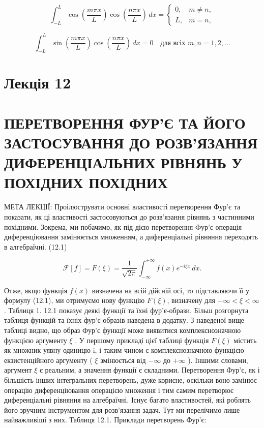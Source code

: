 \documentclass[
  ukrainian,
]{article}
\begin{document}
\[
\int_{-L}^{L} \cos\!\left(\frac{m\pi x}{L}\right)\cos\!\left(\frac{n\pi x}{L}\right)\,dx =
\begin{cases}
0, & m \neq n,\\
L, & m = n,
\end{cases}
\]

\[
\int_{-L}^{L} \sin\!\left(\frac{m\pi x}{L}\right)\cos\!\left(\frac{n\pi x}{L}\right)\,dx = 0
\quad \text{для всіх } m,n=1,2,\dots
\]

\section{Лекція 12}\label{ux43bux435ux43aux446ux456ux44f-12}

\section{ПЕРЕТВОРЕННЯ ФУР'Є ТА ЙОГО ЗАСТОСУВАННЯ ДО РОЗВ'ЯЗАННЯ
ДИФЕРЕНЦІАЛЬНИХ РІВНЯНЬ У ПОХІДНИХ
ПОХІДНИХ}\label{ux43fux435ux440ux435ux442ux432ux43eux440ux435ux43dux43dux44f-ux444ux443ux440ux454-ux442ux430-ux439ux43eux433ux43e-ux437ux430ux441ux442ux43eux441ux443ux432ux430ux43dux43dux44f-ux434ux43e-ux440ux43eux437ux432ux44fux437ux430ux43dux43dux44f-ux434ux438ux444ux435ux440ux435ux43dux446ux456ux430ux43bux44cux43dux438ux445-ux440ux456ux432ux43dux44fux43dux44c-ux443-ux43fux43eux445ux456ux434ux43dux438ux445-ux43fux43eux445ux456ux434ux43dux438ux445}

МЕТА ЛЕКЦІЇ: Проілюструвати основні властивості перетворення Фур'є та
показати, як ці властивості застосовуються до розв'язання рівнянь з
частинними похідними. Зокрема, ми побачимо, як під дією перетворення
Фур'є операція диференціювання замінюється множенням, а диференціальні
рівняння переходять в алгебраїчні. (12.1)

\[
\mathcal{F}[f] = F(\xi) = \frac{1}{\sqrt{2\pi}} \int_{-\infty}^{+\infty} f(x)e^{-i\xi x}\,dx.
\]

Отже, якщо функція \(f(x)\) визначена на всій дійсній осі, то
підставляючи її у формулу (12.1), ми отримуємо нову функцію \(F(\xi)\),
визначену для \(-\infty < \xi < \infty\). Таблиця 1. 12.1 показує деякі
функції та їхні фур'є-образи. Більш розгорнута таблиця функцій та їхніх
фур'є-образів наведена в додатку. З наведеної вище таблиці видно, що
образ Фур'є функції може виявитися комплекснозначною функцією аргументу
\(\xi\) . У першому прикладі цієї таблиці функція \(F(\xi)\) містить як
множник уявну одиницю i, і таким чином є комплекснозначною функцією
екзистенційного аргументу ( \(\xi\) змінюється від \(-\infty\) до
\(+\infty\) ). Іншими словами, аргумент \(\xi\) є реальним, а значення
функції є складними. Перетворення Фур'є, як і більшість інших
інтегральних перетворень, дуже корисне, оскільки воно замінює операцію
диференціювання операцією множення і тим самим перетворює диференціальні
рівняння на алгебраїчні. Існує багато властивостей, які роблять його
зручним інструментом для розв'язання задач. Тут ми перелічимо лише
найважливіші з них. Таблиця 12.1. Приклади перетворень Фур'є:
\end{document}
